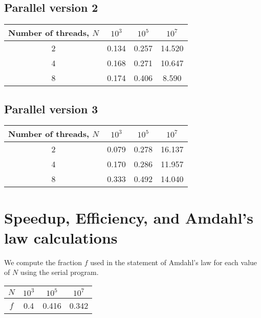\documentclass[a4paper]{article}
\begin{document}
\subsection{Parallel version 2}

\begin{center}
    \begin{tabular}{|c|c|c|c|}
        \hline
        Number of threads, $N$ & $10^3$ & $10^5$ & $10^7$ \\
        \hline
        2  & 0.134 & 0.257 & 14.520 \\
        \hline
        4  & 0.168 & 0.271 & 10.647 \\
        \hline
        8  & 0.174 & 0.406 & 8.590 \\
        \hline
    \end{tabular}
\end{center}

\subsection{Parallel version 3}

\begin{center}
    \begin{tabular}{|c|c|c|c|}
        \hline
        Number of threads, $N$ & $10^3$ & $10^5$ & $10^7$ \\
        \hline
        2  & 0.079 & 0.278 & 16.137 \\
        \hline
        4  & 0.170 & 0.286 & 11.957 \\
        \hline
        8  & 0.333 & 0.492 & 14.040 \\
        \hline
    \end{tabular}
\end{center}

\section{Speedup, Efficiency, and Amdahl's law calculations}

We compute the fraction $f$ used in the statement of Amdahl's law for each value of $N$ using the serial program.

\begin{center}
\begin{tabular}{|c|c|c|c|}
    \hline
    $N$ & $10^3$ & $10^5$ & $10^7$ \\
    \hline
    $f$ & 0.4 & 0.416 & 0.342 \\
    \hline
\end{tabular}
\end{center}
\end{document}
